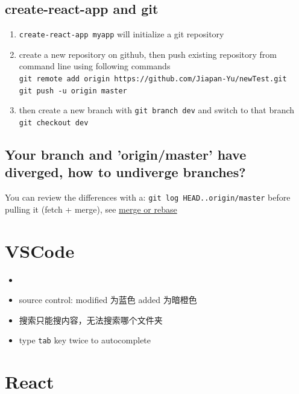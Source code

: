 \documentclass[a4paper, 12pt]{article}
\begin{document}
\subsection{create-react-app and git}
\begin{enumerate}
\item \verb|create-react-app myapp| will initialize a git repository

\item create a new repository on github, then push existing repository from command line using following commands\\
\verb|git remote add origin https://github.com/Jiapan-Yu/newTest.git|\\
\verb|git push -u origin master|

\item then create a new branch with \verb|git branch dev| and switch to that branch\\ \verb|git checkout dev|

\end{enumerate}

\subsection{Your branch and 'origin/master' have diverged, how to undiverge branches?}
You can review the differences with a: \verb|git log HEAD..origin/master| before pulling it (fetch + merge), see \href{https://stackoverflow.com/questions/2452226/master-branch-and-origin-master-have-diverged-how-to-undiverge-branches}{merge or rebase}



\section{VSCode}
\begin{itemize}

\item 

\item source control: modified 为蓝色 \quad added 为暗橙色

\item 搜索只能搜内容，无法搜索哪个文件夹

\item type \verb|tab| key twice to autocomplete
\end{itemize}


\section{React}
\end{document}
